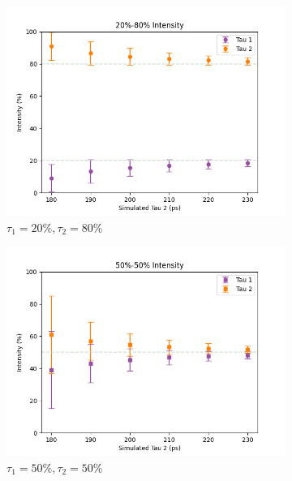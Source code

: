 \begin{figure}[p]
{        \begin{subfigure}{0.7\textwidth}
        \centering
        \includegraphics[width=0.95\linewidth]{Batch 3/single Gaussian IRF/gauss210/150/output/2080.png}
        \caption{$\tau_1 = 20\%, \tau_2 = 80\%$}
        \label{fig:sing-210-2080}
    \end{subfigure}
    \begin{subfigure}{0.7\textwidth}
        \centering
        \includegraphics[width=.95\textwidth]{Batch 3/single Gaussian IRF/gauss210/150/output/5050.png}
        \caption{$\tau_1 = 50\%, \tau_2 = 50\%$}
        \label{fig:sing-210-5050}
    \end{subfigure}
    }
    \begin{subfigure}{0.7\textwidth}
        \centering

\end{subfigure}
\end{figure}
